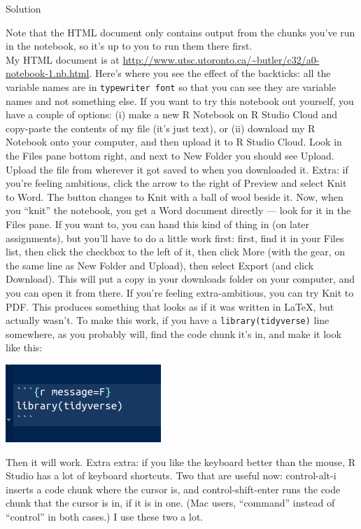 \documentclass[]{tufte-book}
\theoremstyle{definition}
\theoremstyle{definition}
\theoremstyle{definition}
\theoremstyle{remark}
\begin{document}
Solution

Note that the HTML document only contains output from the chunks you've
run in the notebook, so it's up to you to run them there first.\\
My HTML document is at
\url{http://www.utsc.utoronto.ca/~butler/c32/a0-notebook-1.nb.html}.
Here's where you see the effect of the backticks: all the variable names
are in \texttt{typewriter\ font} so that you can see they are variable
names and not something else. If you want to try this notebook out
yourself, you have a couple of options: (i) make a new R Notebook on R
Studio Cloud and copy-paste the contents of my file (it's just text), or
(ii) download my R Notebook onto your computer, and then upload it to R
Studio Cloud. Look in the Files pane bottom right, and next to New
Folder you should see Upload. Upload the file from wherever it got saved
to when you downloaded it. Extra: if you're feeling ambitious, click the
arrow to the right of Preview and select Knit to Word. The button
changes to Knit with a ball of wool beside it. Now, when you ``knit''
the notebook, you get a Word document directly --- look for it in the
Files pane. If you want to, you can hand this kind of thing in (on later
assignments), but you'll have to do a little work first: first, find it
in your Files list, then click the checkbox to the left of it, then
click More (with the gear, on the same line as New Folder and Upload),
then select Export (and click Download). This will put a copy in your
downloads folder on your computer, and you can open it from there. If
you're feeling extra-ambitious, you can try Knit to PDF. This produces
something that looks as if it was written in LaTeX, but actually wasn't.
To make this work, if you have a \texttt{library(tidyverse)} line
somewhere, as you probably will, find the code chunk it's in, and make
it look like this:

\includegraphics{Screenshot_2018-10-10_17-24-47.png}

Then it will work. Extra extra: if you like the keyboard better than the
mouse, R Studio has a lot of keyboard shortcuts. Two that are useful
now: control-alt-i inserts a code chunk where the cursor is, and
control-shift-enter runs the code chunk that the cursor is in, if it is
in one. (Mac users, ``command'' instead of ``control'' in both cases.) I
use these two a lot.
\end{document}

